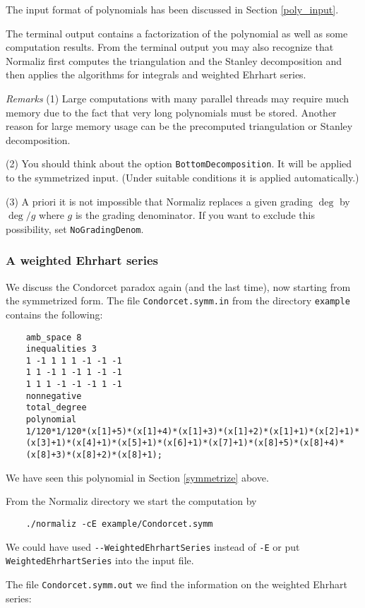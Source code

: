 \documentclass[12pt,a4paper]{scrartcl}
\theoremstyle{definition}
\def\ttt{\texttt}
\begin{document}
{	The input format of polynomials has been discussed in Section \ref{poly_input}.
	
	The terminal output contains a factorization of the polynomial as well as some computation results. From the terminal output you may also recognize that Normaliz first computes the triangulation and the Stanley decomposition and then applies the algorithms for integrals and  weighted Ehrhart series.
	
	\emph{Remarks} \enspace (1) Large computations with many parallel threads may require much memory due to the fact that very long polynomials must be stored. Another reason for large memory usage can be the precomputed triangulation or Stanley decomposition.
	
	(2) You should think about the option \verb|BottomDecomposition|. It will be applied to the symmetrized input. (Under suitable conditions it is applied automatically.)
	
	(3) A priori it is not impossible that Normaliz replaces a given grading $\deg$ by $\deg/g$ where $g$ is the grading denominator. If you want to exclude this possibility, set \verb|NoGradingDenom|.
	
	
	\subsubsection{A weighted Ehrhart series}
	
	We discuss the Condorcet paradox again (and the last time), now starting from the symmetrized form. The file \ttt{Condorcet.symm.in} from the directory
	\ttt{example} contains the following:
	
	\begin{Verbatim}
	amb_space 8
	inequalities 3
	1 -1 1 1 1 -1 -1 -1
	1 1 -1 1 -1 1 -1 -1
	1 1 1 -1 -1 -1 1 -1
	nonnegative
	total_degree
	polynomial
	1/120*1/120*(x[1]+5)*(x[1]+4)*(x[1]+3)*(x[1]+2)*(x[1]+1)*(x[2]+1)*
	(x[3]+1)*(x[4]+1)*(x[5]+1)*(x[6]+1)*(x[7]+1)*(x[8]+5)*(x[8]+4)*
	(x[8]+3)*(x[8]+2)*(x[8]+1);
	\end{Verbatim}
	We have seen this polynomial in Section \ref{symmetrize} above.
	
	
	From the Normaliz directory we start the computation by
	\begin{Verbatim}
	./normaliz -cE example/Condorcet.symm
	\end{Verbatim}
	We could have used \verb|--WeightedEhrhartSeries| instead of \verb|-E| or put \verb|WeightedEhrhartSeries| into the input file.
	
	The file \ttt{Condorcet.symm.out} we find the information on the weighted Ehrhart series:
	
}
\end{document}

